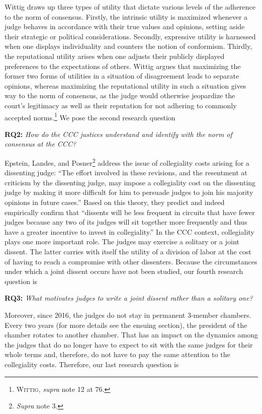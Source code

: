 \documentclass[
  11pt,
]{article}
\begin{document}
Wittig draws up three types of utility that dictate various levels of the adherence to the norm of consensus. Firstly, the intrinsic utility is maximized whenever a judge behaves in accordance with their true values and opinions, setting aside their strategic or political considerations. Secondly, expressive utility is harnessed when one displays individuality and counters the notion of conformism. Thirdly, the reputational utility arises when one adjusts their publicly displayed preferences to the expectations of others. Wittig argues that maximizing the former two forms of utilities in a situation of disagreement leads to separate opinions, whereas maximizing the reputational utility in such a situation gives way to the norm of consensus, as the judge would otherwise jeopardize the court's legitimacy as well as their reputation for not adhering to commonly accepted norms.\footnote{\textsc{Wittig}, \emph{supra} note 12 at 76.} We pose the second research question

\textbf{RQ2:} \emph{How do the CCC justices understand and identify with the norm of consensus at the CCC?}

Epstein, Landes, and Posner\footnote{\emph{Supra} note 3.} address the issue of collegiality costs arising for a dissenting judge: ``The effort involved in these revisions, and the resentment at criticism by the dissenting judge, may impose a collegiality cost on the dissenting judge by making it more difficult for him to persuade judges to join his majority opinions in future cases.'' Based on this theory, they predict and indeed empirically confirm that ``dissents will be less frequent in circuits that have fewer judges because any two of its judges will sit together more frequently and thus have a greater incentive to invest in collegiality.'' In the CCC context, collegiality plays one more important role. The judges may exercise a solitary or a joint dissent. The latter carries with itself the utility of a division of labor at the cost of having to reach a compromise with other dissenters. Because the circumstances under which a joint dissent occurs have not been studied, our fourth research question is

\textbf{RQ3:} \emph{What motivates judges to write a joint dissent rather than a solitary one?}

Moreover, since 2016, the judges do not stay in permanent 3-member chambers. Every two years (for more details see the ensuing section), the president of the chamber rotates to another chamber. That has an impact on the dynamics among the judges that do no longer have to expect to sit with the same judges for their whole terms and, therefore, do not have to pay the same attention to the collegiality costs. Therefore, our last research question is
\end{document}
